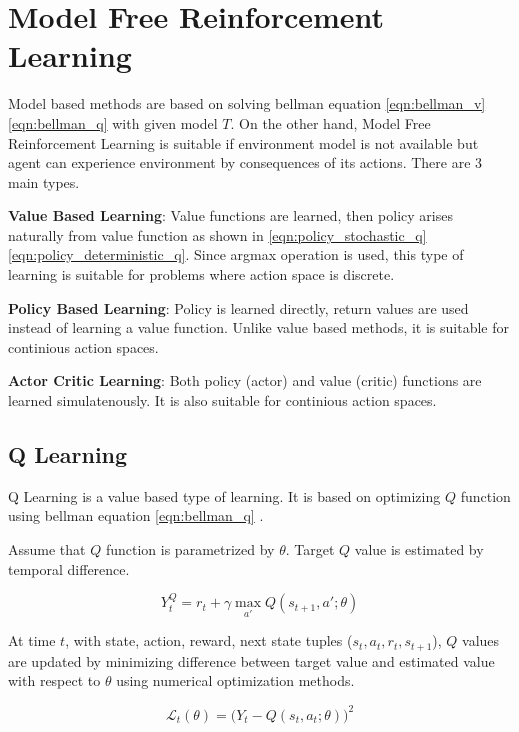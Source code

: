\section{Model Free Reinforcement Learning}
\label{sec:mf_rl}

Model based methods are based on solving bellman equation \ref{eqn:bellman_v}\ref{eqn:bellman_q} with given model $T$. On the other hand, Model Free Reinforcement Learning is suitable if environment model is not available but agent can experience environment by consequences of its actions. There are 3 main types.

\textbf{Value Based Learning}: Value functions are learned, then policy arises naturally from value function as shown in \ref{eqn:policy_stochastic_q} \ref{eqn:policy_deterministic_q}. Since argmax operation is used, this type of learning is suitable for problems where action space is discrete.

\textbf{Policy Based Learning}: Policy is learned directly, return values are used instead of learning a value function. Unlike value based methods, it is suitable for continious action spaces.

\textbf{Actor Critic Learning}: Both policy (actor) and value (critic) functions are learned simulatenously. It is also suitable for continious action spaces. 

\subsection{Q Learning}
Q Learning is a value based type of learning. It is based on optimizing $Q$ function using bellman equation \ref{eqn:bellman_q} \cite{watkins_technical_1992}. 

Assume that $Q$ function is parametrized by $\theta$. Target $Q$ value is estimated by temporal difference.

\begin{equation}
\label{eqn:q_target}
Y_t^Q = r_t + \gamma \max_{a'} Q(s_{t+1},a';\theta)
\end{equation}

At time $t$,  with state, action, reward, next state tuples ($s_t,a_t,r_t,s_{t+1}$), $Q$ values are updated by minimizing difference between target value and estimated value with respect to $\theta$ using numerical optimization methods.

\begin{equation}
\label{eqn:q_loss}
\mathcal{L}_t(\theta) = \big( Y_t - Q(s_t,a_t;\theta) \big) ^ 2
\end{equation}

